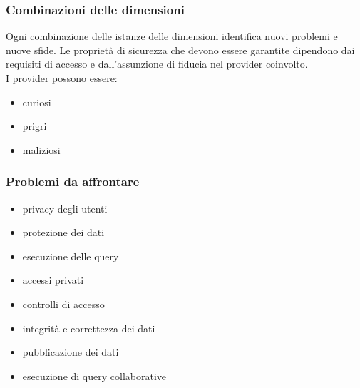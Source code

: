 \subsubsection{Combinazioni delle dimensioni}
Ogni combinazione delle istanze delle dimensioni identifica nuovi problemi e nuove sfide. Le proprietà di sicurezza che devono essere garantite dipendono dai requisiti di accesso e dall'assunzione di fiducia nel provider coinvolto.\\
I provider possono essere:
\begin{itemize}
    \item curiosi
    \item prigri
    \item maliziosi
\end{itemize}

\subsubsection{Problemi da affrontare}
\begin{itemize}
    \item privacy degli utenti
    \item protezione dei dati
    \item esecuzione delle query
    \item accessi privati
    \item controlli di accesso
    \item integrità e correttezza dei dati
    \item pubblicazione dei dati
    \item esecuzione di query collaborative
\end{itemize}

